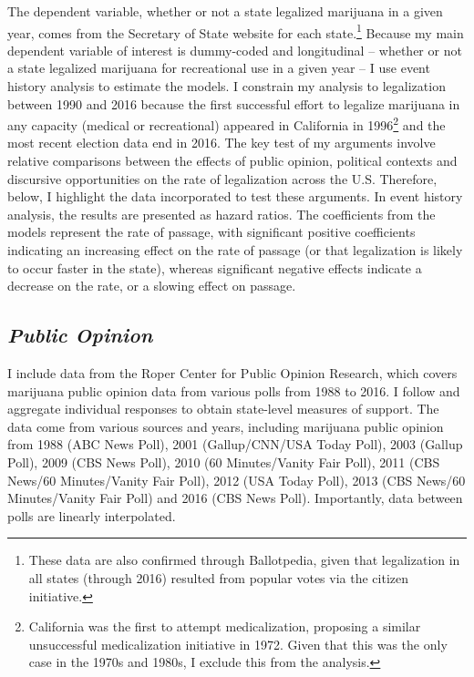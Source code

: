 The dependent variable, whether or not a state legalized marijuana in a given year, comes from the Secretary of State website for each state.\footnote{These data are also confirmed through Ballotpedia, given that legalization in all states (through 2016) resulted from popular votes via the citizen initiative.} Because my main dependent variable of interest is dummy-coded and longitudinal -- whether or not a state legalized marijuana for recreational use in a given year -- I use event history analysis to estimate the models. I constrain my analysis to legalization between 1990 and 2016 because the first successful effort to legalize marijuana in any capacity (medical or recreational) appeared in California in 1996\footnote{California was the first to attempt medicalization, proposing a similar unsuccessful medicalization initiative in 1972. Given that this was the only case in the 1970s and 1980s, I exclude this from the analysis.} and the most recent election data end in 2016. The key test of my arguments involve relative comparisons between the effects of public opinion, political contexts and discursive opportunities on the rate of legalization across the U.S. Therefore, below, I highlight the data incorporated to test these arguments. In event history analysis, the results are presented as hazard ratios. The coefficients from the models represent the rate of passage, with significant positive coefficients indicating an increasing effect on the rate of passage (or that legalization is likely to occur faster in the state), whereas significant negative effects indicate a decrease on the rate, or a slowing effect on passage. 

\subsection{\it{Public Opinion}}

I include data from the Roper Center for Public Opinion Research, which covers marijuana public opinion data from various polls from 1988 to 2016. I follow \citep{weakliem_and_biggert_1999} and aggregate individual responses to obtain state-level measures of support. The data come from various sources and years, including marijuana public opinion from 1988 (ABC News Poll), 2001 (Gallup/CNN/USA Today Poll), 2003 (Gallup Poll), 2009 (CBS News Poll), 2010 (60 Minutes/Vanity Fair Poll), 2011 (CBS News/60 Minutes/Vanity Fair Poll), 2012 (USA Today Poll), 2013 (CBS News/60 Minutes/Vanity Fair Poll) and 2016 (CBS News Poll). Importantly, data between polls are linearly interpolated. 



